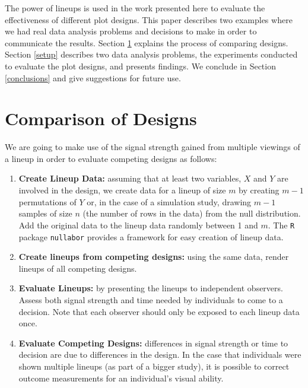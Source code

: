 %
%
% 

The power of lineups is used in the work presented here to evaluate the effectiveness of different plot designs. This paper describes two examples where we had real data analysis problems and decisions to make in order to communicate the results. Section \ref{designs} explains the process of comparing designs. Section \ref{setup} describes two data analysis problems, the experiments conducted to evaluate the plot designs, and presents findings. We conclude in Section \ref{conclusions}  and give suggestions for future use.

\section{Comparison of Designs}\label{designs}
We are going to make use of the signal strength gained from multiple viewings of a lineup in order to evaluate competing designs as follows:
\begin{enumerate}
\item{{\bf Create Lineup Data:} assuming that at least two variables, $X$ and $Y$ are involved in the design, we create data for a lineup of size $m$ by  creating  $m-1$ permutations of $Y$ or, in the case of a simulation study, drawing $m-1$ samples of size $n$ (the number of rows in the data) from the null distribution. Add the original data to the lineup data randomly between 1 and $m$. The {\tt R} package {\tt nullabor} provides a framework for easy creation of lineup data. }
\item{{\bf Create lineups from competing designs:} using the same data, render lineups of all competing designs. }
\item{{\bf Evaluate Lineups:} by presenting the lineups to independent observers. Assess both signal strength and time needed by individuals to come to a decision. Note that each observer should only be exposed to each lineup data once.}
\item{{\bf Evaluate Competing Designs:} differences in signal strength or time to decision are due to differences in the design. In the case that individuals were shown multiple lineups (as part of a bigger study), it is possible to correct outcome measurements for an individual's visual ability. }
\end{enumerate}

